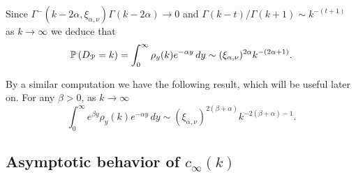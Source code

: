 Since $\Gamma^{-}(k-2\alpha, \xi_{\alpha,\nu})\Gamma(k - 2\alpha) \to 0$  and $\Gamma(k-t)/\Gamma(k+1) \sim k^{-(t+1)}$ as $k \to \infty$ we deduce that
\begin{equation}\label{eq:degree_distribution_P_asymptotics}
	\mathbb{P}\left(D_{{\mathcal P}} = k\right) = \int_0^\infty \rho_{y}(k) e^{-\alpha y} \, dy \sim (\xi_{\alpha,\nu})^{2\alpha} k^{-(2\alpha + 1)}.
\end{equation}

By a similar computation we have the following result, which will be useful later on. For any $\beta > 0$, as $k \to \infty$
\begin{equation}\label{eq:general_integral_rho_y_k}
	\int_0^\infty e^{\beta y} \rho_y(k) e^{-\alpha y} \, dy
    \sim \left(\xi_{\alpha,\nu}\right)^{2(\beta + \alpha)} k^{-2(\beta + \alpha)-1}.
\end{equation}

\subsection{Asymptotic behavior of $c_\infty(k)$}\label{ssec:asymptotics_local_clustering_P}

%

